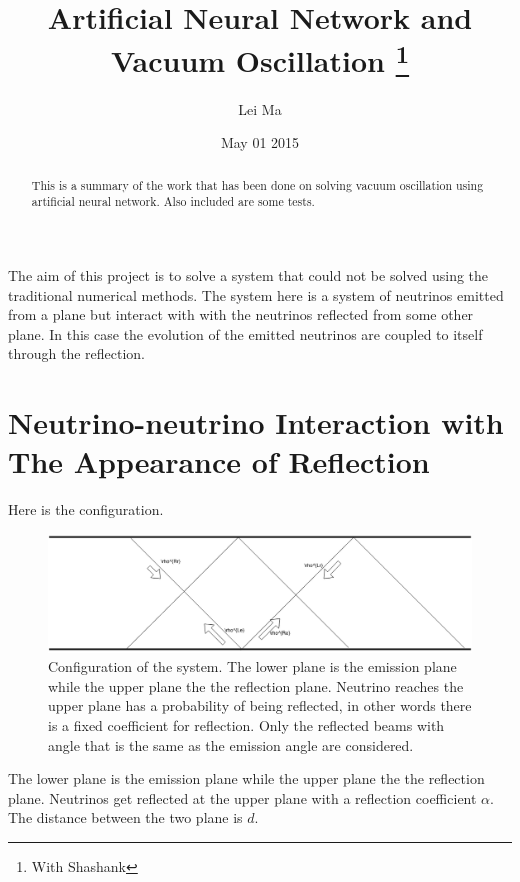 \documentclass{tufte-handout}
\title{Artificial Neural Network and Vacuum Oscillation \thanks{With Shashank}}
\author[Lei Ma]{Lei Ma}
\date{May 01 2015}  %
\begin{document}
\maketitle%

\begin{abstract}
\noindent This is a summary of the work that has been done on solving vacuum oscillation using artificial neural network. Also included are some tests.
\end{abstract}



The aim of this project is to solve a system that could not be solved using the traditional numerical methods. The system here is a system of neutrinos emitted from a plane but interact with with the neutrinos reflected from some other plane. In this case the evolution of the emitted neutrinos are coupled to itself through the reflection.



\section{Neutrino-neutrino Interaction with The Appearance of Reflection}


Here is the configuration.


\begin{figure}\includegraphics{assets/neutrinoWithReflection}
\caption{Configuration of the system. The lower plane is the emission plane while the upper plane the the reflection plane. Neutrino reaches the upper plane has a probability of being reflected, in other words there is a fixed coefficient for reflection. Only the reflected beams with angle that is the same as the emission angle are considered.}
\end{figure}



The lower plane is the emission plane while the upper plane the the reflection plane. Neutrinos get reflected at the upper plane with a reflection coefficient $\alpha$. The distance between the two plane is $d$.
\end{document}

